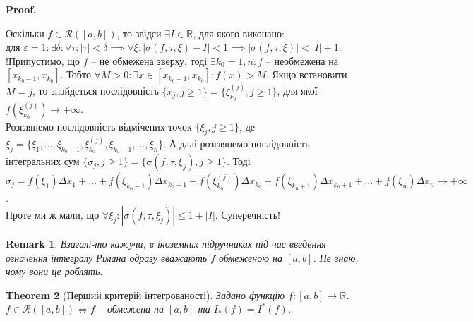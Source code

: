 \documentclass[a4paper, 10pt]{article}
\makeatletter
\def\qed{$\blacksquare$}
\theoremstyle{theoremdd}
\newtheorem{theorem}{Theorem}[subsection]
\theoremstyle{theoremdd}
\theoremstyle{theoremdd}
\theoremstyle{theoremdd}
\theoremstyle{theoremdd}
\theoremstyle{theoremdd}
\theoremstyle{theoremdd}
\newtheorem{remark}[theorem]{Remark}
\theoremstyle{theoremdd}
\theoremstyle{theoremdd}
\renewenvironment{proof}[1][Proof.\\]{\par
\pushQED{\hfill \qed}%
\normalfont \topsep6\p@\@plus6\p@\relax
\trivlist
\item\relax
{\bfseries
#1\@addpunct{.}}\hspace\labelsep\ignorespaces
}{%
\popQED\endtrivlist\@endpefalse
}
\makeatother
\begin{document}
\begin{proof}
Оскільки $f \in \mathcal{R}([a,b])$, то звідси $\exists I \in \mathbb{R}$, для якого виконано:\\
для $\varepsilon = 1: \exists \delta: \forall \tau: |\tau| < \delta \implies \forall \xi: |\sigma(f, \tau, \xi) - I| < 1 \implies |\sigma(f, \tau, \xi)| < |I|+1$.\\
!Припустимо, що $f$ -- не обмежена зверху, тоді $\exists k_0 = \overline{1,n}: f$ -- необмежена на $[x_{k_0-1},x_{k_0}]$. Тобто $\forall M > 0: \exists x \in [x_{k_0-1},x_{k_0}]: f(x) > M$. Якщо встановити $M = j$, то знайдеться послідовність $\{x_j, j \geq 1\} = \{\xi_{k_0}^{(j)}, j \geq 1 \}$, для якої $f \left(\xi_{k_0}^{(j)} \right) \to +\infty$. \\
Розглянемо послідовність відмічених точок $\{\xi_j, j \geq 1\}$, де $\xi_j = \{\xi_1, \dots, \xi_{k_0-1}, \xi_{k_0}^{(j)}, \xi_{k_0+1}, \dots, \xi_n\}$. А далі розглянемо послідовність інтегральних сум $\{\sigma_j, j \geq 1\} = \{\sigma(f,\tau,\xi_j), j \geq 1 \}$. Тоді\\
$\sigma_j = f(\xi_1)\Delta x_1 + \dots + f(\xi_{k_0-1})\Delta x_{k_0-1} + f(\xi_{k_0}^{(j)}) \Delta x_{k_0} + f(\xi_{k_0+1}) \Delta x_{k_0+1} + \dots + f(\xi_n) \Delta x_n \to +\infty$.\\
Проте ми ж мали, що $\forall \xi_j: |\sigma(f,\tau, \xi_j)| \leq 1 + |I|$. Суперечність!
\end{proof}

\begin{remark}
Взагалі-то кажучи, в іноземних підручниках під час введення означення інтегралу Рімана одразу вважають $f$ обмеженою на $[a,b]$. Не знаю, чому вони це роблять.
\end{remark}

\begin{theorem}[Перший критерій інтегрованості]
Задано функцію $f \colon [a,b] \to \mathbb{R}$.\\
$f \in \mathcal{R}([a,b]) \iff f$ -- обмежена на $[a,b]$ та $I_*(f) = I^*(f)$.
\end{theorem}
\end{document}
